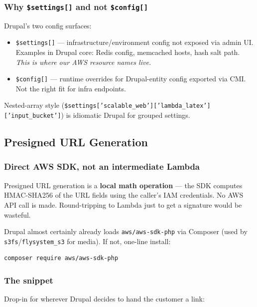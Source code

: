 \documentclass[11pt,letterpaper]{article}
\begin{document}
\subsubsection{Why \texttt{\$settings[]} and not \texttt{\$config[]}}
Drupal's two config surfaces:
\begin{itemize}[nosep]
  \item \texttt{\$settings[]} --- infrastructure/environment config not exposed via admin UI. Examples in Drupal core: Redis config, memcached hosts, hash salt path. \emph{This is where our AWS resource names live.}
  \item \texttt{\$config[]} --- runtime overrides for Drupal-entity config exported via CMI. Not the right fit for infra endpoints.
\end{itemize}

Nested-array style (\texttt{\$settings['scalable\_web']['lambda\_latex']['input\_bucket']}) is idiomatic Drupal for grouped settings.

\subsection{Presigned URL Generation}
\label{sec:meeting-presigned-url}

\subsubsection{Direct AWS SDK, not an intermediate Lambda}
Presigned URL generation is a \textbf{local math operation} --- the SDK computes HMAC-SHA256 of the URL fields using the caller's IAM credentials. No AWS API call is made. Round-tripping to Lambda just to get a signature would be wasteful.

Drupal almost certainly already loads \texttt{aws/aws-sdk-php} via Composer (used by \texttt{s3fs}/\texttt{flysystem\_s3} for media). If not, one-line install:

\begin{lstlisting}[style=worxcode]
composer require aws/aws-sdk-php
\end{lstlisting}

\subsubsection{The snippet}
Drop-in for wherever Drupal decides to hand the customer a link:
\end{document}
